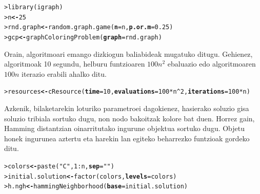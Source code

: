 \documentclass[eu]{ifirak}\usepackage[]{graphicx}\usepackage[]{color}
\makeatletter
\newcommand{\hlnum}[1]{\textcolor[rgb]{0.659,0.4,0.051}{#1}}%
\newcommand{\hlstr}[1]{\textcolor[rgb]{0.659,0.4,0.051}{#1}}%
\newcommand{\hlopt}[1]{\textcolor[rgb]{0,0,0}{#1}}%
\newcommand{\hlstd}[1]{\textcolor[rgb]{0,0,0}{#1}}%
\newcommand{\hlkwb}[1]{\textcolor[rgb]{0.549,0.114,0.412}{\textbf{#1}}}%
\newcommand{\hlkwc}[1]{\textcolor[rgb]{0.659,0.573,0.133}{\textbf{#1}}}%
\newcommand{\hlkwd}[1]{\textcolor[rgb]{0.659,0.133,0.482}{#1}}%
\newenvironment{kframe}{%
 \def\at@end@of@kframe{}%
 \ifinner\ifhmode%
  \def\at@end@of@kframe{\end{minipage}}%
  \begin{minipage}{\columnwidth}%
 \fi\fi%
 \def\FrameCommand##1{\hskip\@totalleftmargin \hskip-\fboxsep
 \colorbox{shadecolor}{##1}\hskip-\fboxsep
     \hskip-\linewidth \hskip-\@totalleftmargin \hskip\columnwidth}%
 \MakeFramed {\advance\hsize-\width
   \@totalleftmargin\z@ \linewidth\hsize
   \@setminipage}}%
 {\par\unskip\endMakeFramed%
 \at@end@of@kframe}
\newenvironment{knitrout}{}{} %
\makeatother
\begin{document}
\begin{knitrout}
\color{fgcolor}\begin{kframe}
\begin{alltt}
\hlstd{> }\hlkwd{library}\hlstd{(igraph)}
\hlstd{> }\hlstd{n} \hlkwb{<-} \hlnum{25}
\hlstd{> }\hlstd{rnd.graph} \hlkwb{<-} \hlkwd{random.graph.game}\hlstd{(}\hlkwc{n}\hlstd{=n,} \hlkwc{p.or.m}\hlstd{=}\hlnum{0.25}\hlstd{)}
\hlstd{> }\hlstd{gcp} \hlkwb{<-} \hlkwd{graphColoringProblem} \hlstd{(}\hlkwc{graph}\hlstd{=rnd.graph)}
\end{alltt}
\end{kframe}
\end{knitrout}

Orain, algoritmoari emango dizkiogun baliabideak mugatuko ditugu. Gehienez, algoritmoak 10 segundu, helburu funtzioaren $100n^2$ ebaluazio edo algoritmoaren $100n$ iterazio erabili ahalko ditu.

\begin{knitrout}
\color{fgcolor}\begin{kframe}
\begin{alltt}
\hlstd{> }\hlstd{resources} \hlkwb{<-} \hlkwd{cResource}\hlstd{(}\hlkwc{time}\hlstd{=}\hlnum{10}\hlstd{,} \hlkwc{evaluations}\hlstd{=}\hlnum{100} \hlopt{*} \hlstd{n}\hlopt{^}\hlnum{2}\hlstd{,} \hlkwc{iterations}\hlstd{=}\hlnum{100} \hlopt{*} \hlstd{n)}
\end{alltt}
\end{kframe}
\end{knitrout}


Azkenik, bilaketarekin loturiko parametroei dagokienez, hasierako soluzio gisa soluzio tribiala sortuko dugu, non nodo bakoitzak kolore bat duen. Horrez gain, Hamming distantzian oinarritutako ingurune objektua sortuko dugu. Objetu honek ingurunea aztertu eta harekin lan egiteko beharrezko funtzioak gordeko ditu.

\begin{knitrout}
\color{fgcolor}\begin{kframe}
\begin{alltt}
\hlstd{> }\hlstd{colors} \hlkwb{<-} \hlkwd{paste}\hlstd{(}\hlstr{"C"}\hlstd{,} \hlnum{1}\hlopt{:}\hlstd{n,} \hlkwc{sep}\hlstd{=}\hlstr{""}\hlstd{)}
\hlstd{> }\hlstd{initial.solution} \hlkwb{<-} \hlkwd{factor} \hlstd{(colors,} \hlkwc{levels}\hlstd{=colors)}
\hlstd{> }\hlstd{h.ngh} \hlkwb{<-} \hlkwd{hammingNeighborhood}\hlstd{(}\hlkwc{base}\hlstd{=initial.solution)}
\end{alltt}
\end{kframe}
\end{knitrout}
\end{document}
